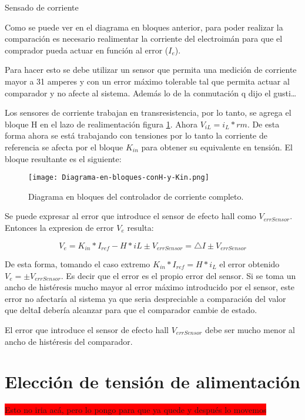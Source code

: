 Sensado de corriente

Como se puede ver en el diagrama en bloques anterior, para poder realizar la comparación es necesario realimentar la corriente del electroimán para que el comprador pueda actuar en función al error ($I_{e}$).

Para hacer esto se debe utilizar un sensor que permita una medición de corriente mayor a 31 amperes y con un error máximo tolerable tal que permita actuar al comparador y no afecte al sistema. Además lo de la conmutación q dijo el gusti…

Los sensores de corriente trabajan en transresistencia, por lo tanto, se agrega el bloque H en el lazo de realimentación figura \ref{fig:img_diag-en-bloques-conH-y-Kin}. Ahora $V_{iL}=i_{L}*rm$. De esta forma ahora se está trabajando con tensiones por lo tanto la corriente de referencia se afecta por el bloque $K_{in}$ para obtener su equivalente en tensión. El bloque resultante es el siguiente:

\begin{figure}[H]
	\centering
	\texttt{[image: Diagrama-en-bloques-conH-y-Kin.png]}
	\caption{Diagrama en bloques del controlador de corriente completo.}
	\label{fig:img_diag-en-bloques-conH-y-Kin}
\end{figure}

Se puede expresar al error que introduce el sensor de efecto hall como $V_{errSensor}$. Entonces la expresion de error $V_{e}$ resulta: 

\begin{equation}\label{eq_error_ve}
	V_{e}= K_{in}*I_{ref}-H*iL\pm V_{errSensor}=\triangle I \pm V_{errSensor}
\end{equation}

	

De esta forma, tomando el  caso extremo $K_{in}*I_{ref}=H*i_{L}$ el error obtenido $V_{e}=\pm V_{errSensor}$.
Es decir que el error es el propio error del sensor. Si se toma un ancho de histéresis mucho mayor al error máximo introducido por el sensor, este error no afectaría al sistema ya que seria despreciable a comparación del valor que deltaI debería alcanzar para que el comparador cambie de estado.

El error que introduce el sensor de efecto hall $V_{errSensor}$ debe ser mucho menor al ancho de histéresis del comparador.




\section{Elección de tensión de alimentación}
\colorbox{red}{Esto no iria acá, pero lo pongo para que ya quede y después lo movemos}

